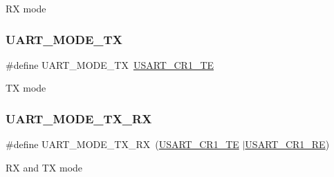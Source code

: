 RX mode \mbox{\label{group___u_a_r_t___mode_gad54f095a1073bcd81787d13fc268bd62}} 
\subsubsection{\texorpdfstring{UART\_MODE\_TX}{UART\_MODE\_TX}}
{\footnotesize\ttfamily \#define U\+A\+R\+T\+\_\+\+M\+O\+D\+E\+\_\+\+TX~\mbox{\hyperlink{group___peripheral___registers___bits___definition_gade7f090b04fd78b755b43357ecaa9622}{U\+S\+A\+R\+T\+\_\+\+C\+R1\+\_\+\+TE}}}

TX mode \mbox{\label{group___u_a_r_t___mode_gab47c162935901e89322e2ce6700b6744}} 
\subsubsection{\texorpdfstring{UART\_MODE\_TX\_RX}{UART\_MODE\_TX\_RX}}
{\footnotesize\ttfamily \#define U\+A\+R\+T\+\_\+\+M\+O\+D\+E\+\_\+\+T\+X\+\_\+\+RX~(\mbox{\hyperlink{group___peripheral___registers___bits___definition_gade7f090b04fd78b755b43357ecaa9622}{U\+S\+A\+R\+T\+\_\+\+C\+R1\+\_\+\+TE}} $\vert$\mbox{\hyperlink{group___peripheral___registers___bits___definition_gada0d5d407a22264de847bc1b40a17aeb}{U\+S\+A\+R\+T\+\_\+\+C\+R1\+\_\+\+RE}})}

RX and TX mode 